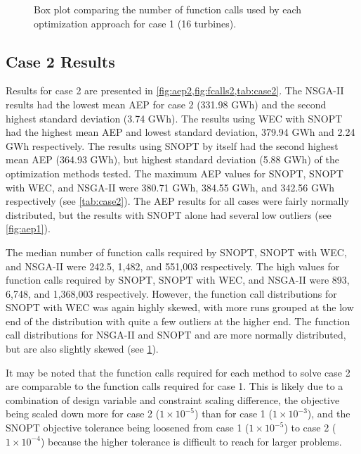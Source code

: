 \documentclass[a4paper]{jpconf}
\begin{document}
\begin{figure}[h!]
\begin{minipage}[t]{18pc}
\caption{Box plot comparing the number of function calls used by each optimization approach for case 1 (16 turbines).}
\label{fig:fcalls1}
\end{minipage}
\end{figure}
%

\subsection{Case 2 Results}

Results for case 2 are presented in \cref{fig:aep2,fig:fcalls2,tab:case2}. The NSGA-II results had the lowest mean AEP for case 2 (331.98 GWh) and the second highest standard deviation (3.74 GWh). The results using WEC with SNOPT had the highest mean AEP and lowest standard deviation, 379.94 GWh and 2.24 GWh respectively. The results using SNOPT by itself had the second highest mean AEP (364.93 GWh), but highest standard deviation (5.88 GWh) of the optimization methods tested. The maximum AEP values for SNOPT, SNOPT with WEC, and NSGA-II were 380.71 GWh, 384.55 GWh, and 342.56 GWh respectively (see \cref{tab:case2}). The AEP results for all cases were fairly normally distributed, but the results with SNOPT alone had several low outliers (see \cref{fig:aep1}).

 The median number of function calls required by SNOPT, SNOPT with WEC, and NSGA-II were 242.5, 1,482, and 551,003 respectively. The high values for function calls required by SNOPT, SNOPT with WEC, and NSGA-II were 893, 6,748, and 1,368,003 respectively. However, the function call distributions for SNOPT with WEC was again highly skewed, with more runs grouped at the low end of the distribution with quite a few outliers at the higher end. The function call distributions for NSGA-II and SNOPT and are more normally distributed, but are also slightly skewed (see \cref{fig:fcalls1}).

It may be noted that the function calls required for each method to solve case 2 are comparable to the function calls required for case 1. This is likely due to a combination of design variable and constraint scaling difference, the objective being scaled down more for case 2 ($1\times10^{-5}$) than for case 1 ($1\times10^{-3}$), and the SNOPT objective tolerance being loosened from case 1 ($1\times10^{-5}$) to case 2 ($1\times10^{-4}$) because the higher tolerance is difficult to reach for larger problems.
\end{document}
